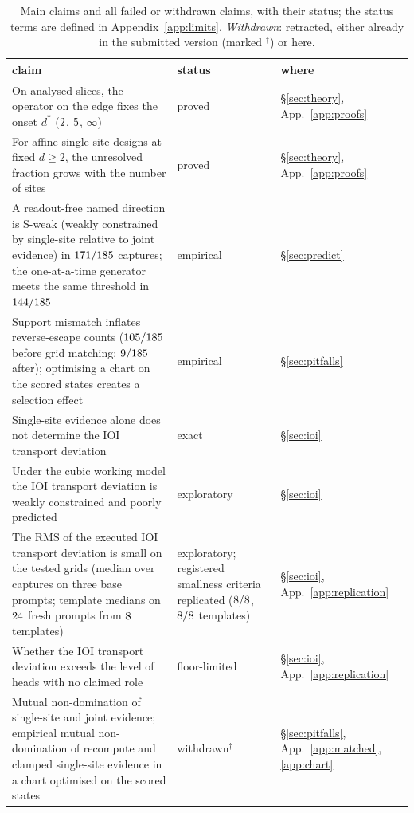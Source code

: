 \documentclass{article}
\theoremstyle{plain}
\theoremstyle{definition}
\begin{document}
\begin{table}[t]
\centering\footnotesize
\caption{Main claims and all failed or withdrawn claims, with their status; the status terms are defined in Appendix~\ref{app:limits}. \emph{Withdrawn}: retracted, either already in the submitted version (marked $^{\dagger}$) or here.}
\label{tab:status}
\begin{tabularx}{\textwidth}{@{}>{\raggedright\arraybackslash}X >{\raggedright\arraybackslash}p{} l@{}}
\toprule
claim & status & where \\
\midrule
On analysed slices, the operator on the edge fixes the onset $d^*$ ($2$, $5$, $\infty$) & proved & \S\ref{sec:theory}, App.~\ref{app:proofs} \\
For affine single-site designs at fixed $d\ge2$, the unresolved fraction grows with the number of sites & proved & \S\ref{sec:theory}, App.~\ref{app:proofs} \\
\midrule
A readout-free named direction is S-weak (weakly constrained by single-site relative to joint evidence) in $171/185$ captures; the one-at-a-time generator meets the same threshold in $144/185$ & empirical & \S\ref{sec:predict} \\
Support mismatch inflates reverse-escape counts ($105/185$ before grid matching; $9/185$ after); optimising a chart on the scored states creates a selection effect & empirical & \S\ref{sec:pitfalls} \\
\midrule
Single-site evidence alone does not determine the IOI transport deviation & exact & \S\ref{sec:ioi} \\
Under the cubic working model the IOI transport deviation is weakly constrained and poorly predicted & exploratory & \S\ref{sec:ioi} \\
The RMS of the executed IOI transport deviation is small on the tested grids (median over captures on three base prompts; template medians on $24$ fresh prompts from $8$ templates) & exploratory; registered smallness criteria replicated ($8/8$, $8/8$ templates) & \S\ref{sec:ioi}, App.~\ref{app:replication} \\
Whether the IOI transport deviation exceeds the level of heads with no claimed role & floor-limited & \S\ref{sec:ioi}, App.~\ref{app:replication} \\
\midrule
Mutual non-domination of single-site and joint evidence; empirical mutual non-domination of recompute and clamped single-site evidence in a chart optimised on the scored states & withdrawn$^{\dagger}$ & \S\ref{sec:pitfalls}, App.~\ref{app:matched}, \ref{app:chart} \\

\end{tabularx}
\end{table}
\end{document}
